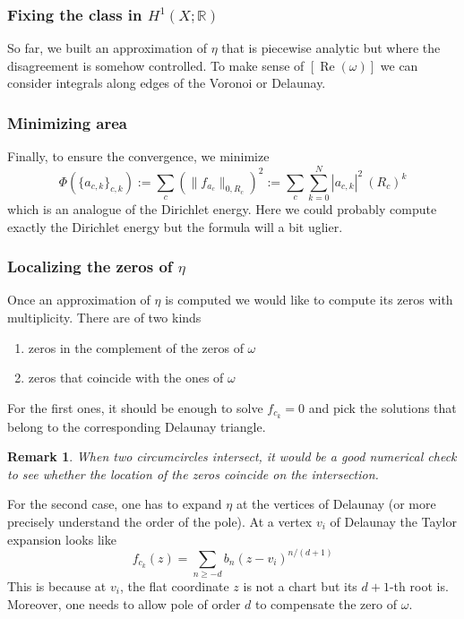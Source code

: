 \documentclass[a4paper,12pt]{article}
\def\bR{\mathbb{R}}
\def\Re{\operatorname{Re}}
\newtheorem{remark}[definition]{Remark}
\begin{document}
\subsubsection{Fixing the class in $H^1(X; \bR)$}
So far, we built an approximation of $\eta$ that is piecewise analytic but
where the disagreement is somehow controlled. To make sense of $[\Re(\omega)]$
we can consider integrals along edges of the Voronoi or Delaunay.

\subsubsection{Minimizing area}
Finally, to ensure the convergence, we minimize
\begin{equation}
\label{eq:L2minimization}
\Phi(\{a_{c,k}\}_{c,k})
:= \sum_c \left( \|f_{a_c}\|_{0, R_c} \right)^2
:= \sum_c \sum_{k=0}^{N} |a_{c,k}|^2 \ (R_c)^k
\end{equation}
which is an analogue of the Dirichlet energy. Here we could probably compute exactly
the Dirichlet energy but the formula will a bit uglier.

\subsubsection{Localizing the zeros of $\eta$}
Once an approximation of $\eta$ is computed we would like to compute its zeros
with multiplicity. There are of two kinds
\begin{enumerate}
\item zeros in the complement of the zeros of $\omega$
\item zeros that coincide with the ones of $\omega$
\end{enumerate}
For the first ones, it should be enough to solve $f_{c_k} = 0$ and pick the
solutions that belong to the corresponding Delaunay triangle.

\begin{remark}
When two circumcircles intersect, it would be a good numerical check to see
whether the location of the zeros coincide on the intersection.
\end{remark}

For the second case, one has to expand $\eta$ at the
vertices of Delaunay (or more precisely understand the order
of the pole). At a vertex $v_i$ of Delaunay the Taylor expansion
looks like
\[
f_{c_k}(z) = \sum_{n \ge -d} b_n (z - v_i)^{n/(d+1)}
\]
This is because at $v_i$, the flat coordinate $z$ is not a chart
but its $d+1$-th root is. Moreover, one needs to allow pole of order
$d$ to compensate the zero of $\omega$.
\end{document}
